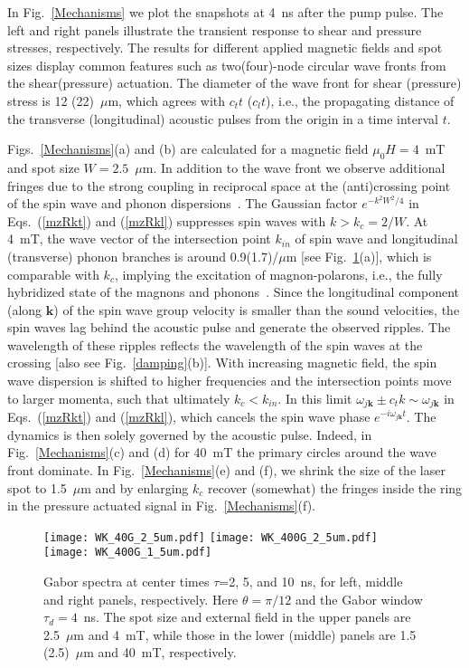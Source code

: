 \documentclass[aps,prb,twocolumn,superscriptaddress,floatfix]{revtex4}%
\begin{document}
In Fig.~\ref{Mechanisms} we plot the snapshots at 4~ns after the pump pulse. The left and right panels illustrate the transient response to shear and pressure stresses, respectively. The results for different applied magnetic fields and spot sizes display common features such as two(four)-node circular wave fronts from the shear(pressure) actuation. The diameter of the wave front for shear (pressure) stress is 12 (22)~$\mu$m, which agrees with  $c_t t$ ($c_l t$), i.e., the propagating distance of the transverse (longitudinal) acoustic pulses from the origin in a time interval $t$.  

Figs.~\ref{Mechanisms}(a) and (b) are calculated for a magnetic field $\mu_0H=4$~mT and spot size $W=2.5$~$\mu$m. In addition to the wave front we observe additional fringes due to the strong coupling in reciprocal space at the (anti)crossing point of the spin wave and phonon dispersions~\cite{Shen15,Kikkawa_polaron,Kittel58}. The Gaussian factor $e^{-k^2W^2/4}$ in Eqs.~(\ref{mzRkt}) and (\ref{mzRkl}) suppresses spin waves with $k>k_c= 2/W$. At 4~mT, the wave vector of the intersection point $k_{in}$ of spin wave and longitudinal (transverse) phonon branches is around 0.9(1.7)/$\mu$m [see Fig.~\ref{WK_Gabor}(a)], which is comparable with $k_c$, implying the excitation of magnon-polarons, i.e., the fully hybridized state of the magnons and phonons~\cite{Shen15,Kikkawa_polaron}. Since the longitudinal component (along $\mathbf k$) of the spin wave group velocity is smaller than the sound velocities, the spin waves lag behind the acoustic pulse and generate the observed ripples. 
The wavelength of these ripples reflects the wavelength of the spin waves at the crossing [also see Fig.~\ref{damping}(b)].
With increasing magnetic field, the spin wave dispersion is shifted to higher frequencies and the intersection points move to larger momenta, such that ultimately $k_c< k_{in}$. In this limit $\omega_{j\mathbf k}\pm c_t k\sim \omega_{j\mathbf k}$ in Eqs.~(\ref{mzRkt}) and (\ref{mzRkl}), which cancels the spin wave phase $e^{-i\omega_{j\mathbf k}t}$. The dynamics is then solely governed by the acoustic pulse. Indeed, in Fig.~\ref{Mechanisms}(c) and (d) for 40~mT the primary circles around the wave front dominate. In Fig.~\ref{Mechanisms}(e) and (f), we shrink the size of the laser spot to 1.5~$\mu$m and by enlarging $k_c$ recover (somewhat) the fringes inside the ring in the pressure actuated signal in Fig.~\ref{Mechanisms}(f).

\begin{figure}[ptb]
\texttt{[image: WK\_40G\_2\_5um.pdf]}
\texttt{[image: WK\_400G\_2\_5um.pdf]}
\texttt{[image: WK\_400G\_1\_5um.pdf]}
\caption{Gabor spectra at center times $\tau$=2, 5, and 10~ns, for left, middle and right panels, respectively. Here $\theta=\pi/12$ and the Gabor window $\tau_d=4$~ns. The spot size and external field in the upper panels are 2.5~$\mu$m and 4~mT, while those in the lower (middle) panels are 1.5 (2.5)~$\mu$m and 40~mT, respectively.}%
\label{WK_Gabor}%
\end{figure}
\end{document}
